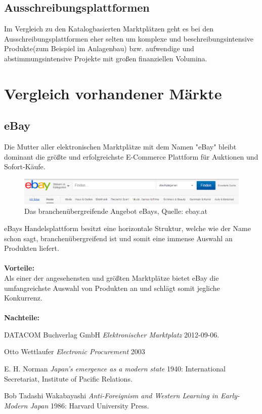 \documentclass[11pt,a4paper]{article}
\begin{document}
\newpage
\subsection{Ausschreibungsplattformen}

Im Vergleich zu den Katalogbasierten Marktplätzen geht es bei den Ausschreibungsplattformen eher selten um komplexe und beschreibungsintensive Produkte(zum Beispiel im Anlagenbau) bzw. aufwendige und abstimmungsintensive Projekte mit großen finanziellen Volumina. 

\section{Vergleich vorhandener Märkte}

\subsection{eBay}

Die Mutter aller elektronischen Marktplätze mit dem Namen "eBay" bleibt dominant die größte und erfolgreichste E-Commerce Plattform für Auktionen und Sofort-Käufe.

\begin{figure}[ht!]
	\centering
	\includegraphics[width=180mm]{ebay}
	\caption{Das branchenübergreifende Angebot eBays, Quelle: ebay.at \label{ebay}}
\end{figure}

\noindent eBays Handelsplattform besitzt eine horizontale Struktur, welche wie der Name schon sagt, branchenübergreifend ist und somit eine immense Auswahl an Produkten liefert. \\ \\

\noindent \textbf{Vorteile:} \\ 
Als einer der angesehensten und größten Marktplätze bietet eBay die umfangreichste Auswahl von Produkten an und schlägt somit jegliche Konkurrenz. \\ \\

\noindent \textbf{Nachteile:} \\

\newpage
\begin{thebibliography}{1}
	
	 DATACOM Buchverlag GmbH {\em Elektronischer Marktplatz}  2012-09-06.
	
	  Otto Wettlaufer {\em Electronic Procurement} 2003
	
	 E. H. Norman {\em Japan's emergence as a modern
		state} 1940: International Secretariat, Institute of Pacific
	Relations.
	
	 Bob Tadashi Wakabayashi {\em Anti-Foreignism and Western
		Learning in Early-Modern Japan} 1986: Harvard University Press.
	
\end{thebibliography}
\end{document}
